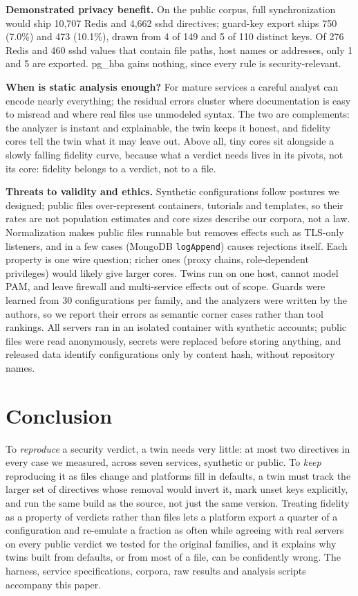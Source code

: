 \documentclass[conference]{IEEEtran}
\begin{document}
\textbf{Demonstrated privacy benefit.} On the public corpus, full synchronization would ship 10,707 Redis and 4,662 sshd directives; guard-key export ships 750 (7.0\%) and 473 (10.1\%), drawn from 4 of 149 and 5 of 110 distinct keys. Of 276 Redis and 460 sshd values that contain file paths, host names or addresses, only 1 and 5 are exported. pg\_hba gains nothing, since every rule is security-relevant.

\textbf{When is static analysis enough?} For mature services a careful analyst can encode nearly everything; the residual errors cluster where documentation is easy to misread and where real files use unmodeled syntax. The two are complements: the analyzer is instant and explainable, the twin keeps it honest, and fidelity cores tell the twin what it may leave out. Above all, tiny cores sit alongside a slowly falling fidelity curve, because what a verdict needs lives in its pivots, not its core: fidelity belongs to a verdict, not to a file.

\textbf{Threats to validity and ethics.} Synthetic configurations follow postures we designed; public files over-represent containers, tutorials and templates, so their rates are not population estimates and core sizes describe our corpora, not a law. Normalization makes public files runnable but removes effects such as TLS-only listeners, and in a few cases (MongoDB \texttt{logAppend}) causes rejections itself. Each property is one wire question; richer ones (proxy chains, role-dependent privileges) would likely give larger cores. Twins run on one host, cannot model PAM, and leave firewall and multi-service effects out of scope. Guards were learned from 30 configurations per family, and the analyzers were written by the authors, so we report their errors as semantic corner cases rather than tool rankings. All servers ran in an isolated container with synthetic accounts; public files were read anonymously, secrets were replaced before storing anything, and released data identify configurations only by content hash, without repository names.

\section{Conclusion}
To \emph{reproduce} a security verdict, a twin needs very little: at most two directives in every case we measured, across seven services, synthetic or public. To \emph{keep} reproducing it as files change and platforms fill in defaults, a twin must track the larger set of directives whose removal would invert it, mark unset keys explicitly, and run the same build as the source, not just the same version. Treating fidelity as a property of verdicts rather than files lets a platform export a quarter of a configuration and re-emulate a fraction as often while agreeing with real servers on every public verdict we tested for the original families, and it explains why twins built from defaults, or from most of a file, can be confidently wrong. The harness, service specifications, corpora, raw results and analysis scripts accompany this paper.
\end{document}
